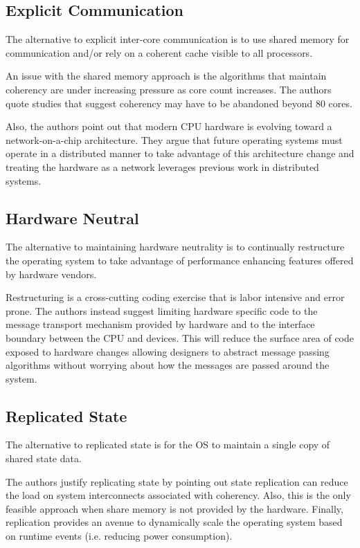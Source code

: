 \documentclass[12pt]{article}
\begin{document}
\subsection*{Explicit Communication}
The alternative to explicit inter-core communication is to use shared
memory for communication and/or rely on a coherent cache visible to
all processors.

An issue with the shared memory approach is the algorithms that
maintain coherency are under increasing pressure as core count
increases.  The authors quote studies that suggest coherency may have
to be abandoned beyond 80 cores.

Also, the authors point out that modern CPU hardware is evolving
toward a network-on-a-chip architecture.  They argue that future
operating systems must operate in a distributed manner to take
advantage of this architecture change and treating the hardware as
a network leverages previous work in distributed systems.


\subsection*{Hardware Neutral}
The alternative to maintaining hardware neutrality is to continually
restructure the operating system to take advantage of performance
enhancing features offered by hardware vendors.

Restructuring is a cross-cutting coding exercise that is labor
intensive and error prone.  The authors instead suggest limiting
hardware specific code to the message transport mechanism provided by
hardware and to the interface boundary between the CPU and devices.
This will reduce the surface area of code exposed to hardware changes
allowing designers to abstract message passing algorithms without
worrying about how the messages are passed around the system.

\subsection*{Replicated State}
The alternative to replicated state is for the OS to maintain a single
copy of shared state data.

The authors justify replicating state by pointing out state
replication can reduce the load on system interconnects associated
with coherency.  Also, this is the only feasible approach when share
memory is not provided by the hardware.  Finally, replication provides
an avenue to dynamically scale the operating system based on runtime
events (i.e. reducing power consumption).
\end{document}
